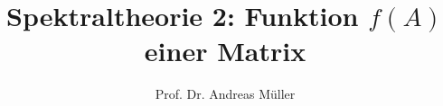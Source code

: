 %
%
%


\beamertemplatenavigationsymbolsempty
\title[Spektraltheorie~2]{Spektraltheorie 2: Funktion $f(A)$ einer Matrix}
\author[A.~Müller]{Prof. Dr. Andreas Müller}
\date[]{}

